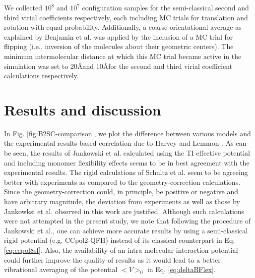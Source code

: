         We collected $10^8$ and $10^7$ configuration samples for the semi-classical second and third virial coefficients respectively, each including MC trials for translation and rotation with equal probability. Additionally, a coarse orientational average as explained by Benjamin et al. \cite{Benjamin2009} was applied by the inclusion of a MC trial for flipping (i.e., inversion of the molecules about their geometric centers). The minimum intermolecular distance at which this MC trial became active in the simulation was set to 20\AA and 10\AA for the second and third virial coefficient calculations respectively.

\section{Results and discussion}
    \label{sec:results}
        In Fig. \ref{fig:B2SC-comparison}, we plot the difference between various models and the experimental results based correlation due to Harvey and Lemmon \cite{Harvey2004}. As can be seen, the results of Jankowski et al. \cite{Jankowski2015} calculated using the TI effective potential and including monomer flexibility effects seems to be in best agreement with the experimental results. The rigid calculations of Schultz et al. \cite{Schultz2015} seem to be agreeing better with experiments as compared to the geometry-correction calculations. Since the geometry-correction could, in principle, be positive or negative and have arbitrary magnitude, the deviation from experiments as well as those by Jankowksi et al.\cite{Jankowski2015} observed in this work are justified. Although such calculations were not attempted in the present study, we note that following the procedure of Jankowski et al.\cite{Jankowski2015}, one can achieve more accurate results by using a semi-classical rigid potential (e.g. CCpol2-QFH) instead of its classical counterpart in Eq. \eqref{eq:ccpol8sf}. Also, the availability of an intra-molecular interaction potential could further improve the quality of results as it would lead to a better vibrational averaging of the potential $<V>_0$ in Eq. \eqref{eq:deltaBFlex}.
